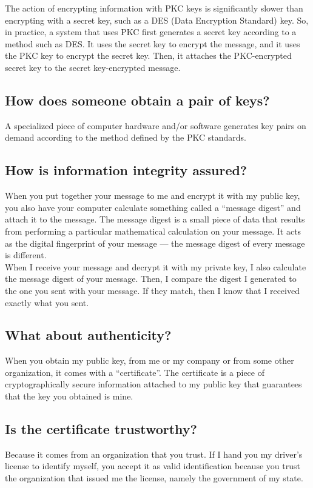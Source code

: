 The action of encrypting information with PKC keys is significantly
slower than encrypting with a secret key, such as a DES (Data
Encryption Standard) key. So, in practice, a system that uses PKC first
generates a secret key according to a method such as DES. It uses the
secret key to encrypt the message, and it uses the PKC key to encrypt
the secret key. Then, it attaches the PKC-encrypted secret key to the
secret key-encrypted message.


\subsection{How does someone obtain a pair of keys?}
A specialized piece of computer hardware and/or software generates key
pairs on demand according to the method defined by the PKC standards.


\subsection{How is information integrity assured?}
When you put together your message to me and encrypt it with my public
key, you also have your computer calculate something called a ``message
digest'' and attach it to the message. The message digest is a small
piece of data that results from performing a particular mathematical
calculation on your message. It acts as the digital fingerprint of your
message --- the message digest of every message is different.\\

When I receive your message and decrypt it with my private key, I also
calculate the message digest of your message. Then, I compare the
digest I generated to the one you sent with your message. If they
match, then I know that I received exactly what you sent.


\subsection{What about authenticity?}
When you obtain my public key, from me or my company or from some other
organization, it comes with a ``certificate''. The certificate is a
piece of cryptographically secure information attached to my public key
that guarantees that the key you obtained is mine.


\subsection{Is the certificate trustworthy?}
Because it comes from an organization that you trust. If I hand you my
driver's license to identify myself, you accept it as valid
identification because you trust the organization that issued me the
license, namely the government of my state.\\


